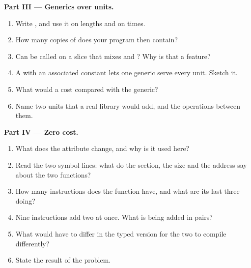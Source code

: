 \begin{problem}
\medskip\noindent\textbf{Part III --- Generics over units.}\par\nopagebreak
\begin{enumerate}[resume, beginpenalty=10000]
\item Write , and use it on lengths and on times.
\item How many copies of  does your program then contain?
\item Can  be called on a slice that mixes  and ? Why is that a feature?
\item A   with an associated constant  lets one generic 
serve every unit. Sketch it.
\item What would a   cost compared with the generic?
\item Name two units that a real library would add, and the operations between them.
\end{enumerate}

\medskip\noindent\textbf{Part IV --- Zero cost.}\par\nopagebreak
{}
\begin{enumerate}[resume, beginpenalty=10000]
\item What does the attribute  change, and why is it used here?
\item Read the two symbol lines: what do the section, the size and the address say about the two functions?
\item How many instructions does the function have, and what are its last three doing?
\item Nine  instructions add two  at once. What is being added in pairs?
\item What would have to differ in the typed version for the two to compile differently?
\item State the result of the problem.
\end{enumerate}
\end{problem}
